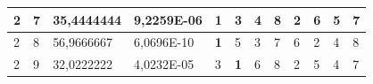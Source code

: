 \documentclass[conference]{IEEEtran}
\begin{document}
\begin{table}[]
\begin{tabular}{|llll|llllllll|}
\multicolumn{1}{|l|}{2}                                                     & \multicolumn{1}{l|}{7}                                                        & \multicolumn{1}{l|}{35,4444444}                                                   & 9,2259E-06                     & \multicolumn{1}{l|}{\textbf{1}}                                         & \multicolumn{1}{l|}{3}                                                  & \multicolumn{1}{l|}{4}                                                  & \multicolumn{1}{l|}{8}                                                  & \multicolumn{1}{l|}{2}                                                  & \multicolumn{1}{l|}{6}                                                  & \multicolumn{1}{l|}{5}                                                  & 7                          \\ \hline
\multicolumn{1}{|l|}{2}                                                     & \multicolumn{1}{l|}{8}                                                        & \multicolumn{1}{l|}{56,9666667}                                                   & 6,0696E-10                     & \multicolumn{1}{l|}{\textbf{1}}                                         & \multicolumn{1}{l|}{5}                                                  & \multicolumn{1}{l|}{3}                                                  & \multicolumn{1}{l|}{7}                                                  & \multicolumn{1}{l|}{6}                                                  & \multicolumn{1}{l|}{2}                                                  & \multicolumn{1}{l|}{4}                                                  & 8                          \\ \hline
\multicolumn{1}{|l|}{2}                                                     & \multicolumn{1}{l|}{9}                                                        & \multicolumn{1}{l|}{32,0222222}                                                   & 4,0232E-05                     & \multicolumn{1}{l|}{3}                                                  & \multicolumn{1}{l|}{\textbf{1}}                                         & \multicolumn{1}{l|}{6}                                                  & \multicolumn{1}{l|}{8}                                                  & \multicolumn{1}{l|}{2}                                                  & \multicolumn{1}{l|}{5}                                                  & \multicolumn{1}{l|}{4}                                                  & 7                          \\ \hline

\end{tabular}
\end{table}
\end{document}

